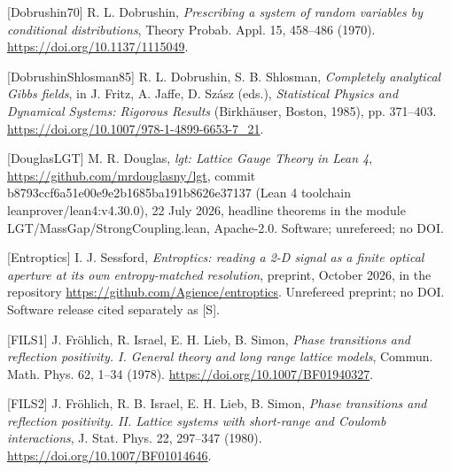 \documentclass[10pt,letterpaper,twocolumn]{article}
\begin{document}
{[}Dobrushin70{]} R. L. Dobrushin, \emph{Prescribing a system of random variables by conditional distributions}, Theory Probab. Appl. 15, 458--486 (1970). \href{https://doi.org/10.1137/1115049}{https:\allowbreak{}/\allowbreak{}/\allowbreak{}doi.\allowbreak{}org/\allowbreak{}10.\allowbreak{}1137/\allowbreak{}1115049}.

{[}DobrushinShlosman85{]} R. L. Dobrushin, S. B. Shlosman, \emph{Completely analytical Gibbs fields}, in J. Fritz, A. Jaffe, D. Szász (eds.), \emph{Statistical Physics and Dynamical Systems: Rigorous Results} (Birkhäuser, Boston, 1985), pp. 371--403. \href{https://doi.org/10.1007/978-1-4899-6653-7_21}{https:\allowbreak{}/\allowbreak{}/\allowbreak{}doi.\allowbreak{}org/\allowbreak{}10.\allowbreak{}1007/\allowbreak{}978-\allowbreak{}1-\allowbreak{}4899-\allowbreak{}6653-\allowbreak{}7\_\allowbreak{}21}.

{[}DouglasLGT{]} M. R. Douglas, \emph{lgt: Lattice Gauge Theory in Lean 4}, \href{https://github.com/mrdouglasny/lgt}{https:\allowbreak{}/\allowbreak{}/\allowbreak{}github.\allowbreak{}com/\allowbreak{}mrdougla\allowbreak{}sny/\allowbreak{}lgt}, commit b8793ccf\allowbreak{}6a51e00e\allowbreak{}9e2b1685\allowbreak{}ba191b86\allowbreak{}26e37137 (Lean 4 toolchain leanprov\allowbreak{}er/\allowbreak{}lean4:\allowbreak{}v4.\allowbreak{}30.\allowbreak{}0)\allowbreak{}, 22 July 2026, headline theorems in the module LGT/\allowbreak{}MassGap/\allowbreak{}StrongCo\allowbreak{}upling.\allowbreak{}lean, Apache-2.0. Software; unrefereed; no DOI.

{[}Entroptics{]} I. J. Sessford, \emph{Entroptics: reading a 2-D signal as a finite optical aperture at its own entropy-matched resolution}, preprint, October 2026, in the repository \href{https://github.com/Agience/entroptics}{https:\allowbreak{}/\allowbreak{}/\allowbreak{}github.\allowbreak{}com/\allowbreak{}Agience/\allowbreak{}entropti\allowbreak{}cs}. Unrefereed preprint; no DOI. Software release cited separately as {[}S{]}.

{[}FILS1{]} J. Fröhlich, R. Israel, E. H. Lieb, B. Simon, \emph{Phase transitions and reflection positivity. I. General theory and long range lattice models}, Commun. Math. Phys. 62, 1--34 (1978). \href{https://doi.org/10.1007/BF01940327}{https:\allowbreak{}/\allowbreak{}/\allowbreak{}doi.\allowbreak{}org/\allowbreak{}10.\allowbreak{}1007/\allowbreak{}BF019403\allowbreak{}27}.

{[}FILS2{]} J. Fröhlich, R. B. Israel, E. H. Lieb, B. Simon, \emph{Phase transitions and reflection positivity. II. Lattice systems with short-range and Coulomb interactions}, J. Stat. Phys. 22, 297--347 (1980). \href{https://doi.org/10.1007/BF01014646}{https:\allowbreak{}/\allowbreak{}/\allowbreak{}doi.\allowbreak{}org/\allowbreak{}10.\allowbreak{}1007/\allowbreak{}BF010146\allowbreak{}46}.
\end{document}
